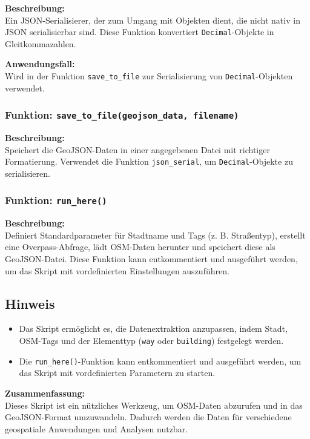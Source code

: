 \textbf{Beschreibung:}\\
Ein JSON-Serialisierer, der zum Umgang mit Objekten dient, die nicht nativ in JSON serialisierbar sind. Diese Funktion konvertiert \texttt{Decimal}-Objekte in Gleitkommazahlen.

\textbf{Anwendungsfall:}\\
Wird in der Funktion \texttt{save\_to\_file} zur Serialisierung von \texttt{Decimal}-Objekten verwendet.

\subsubsection{Funktion: \texttt{save\_to\_file(geojson\_data, filename)}}

\textbf{Beschreibung:}\\
Speichert die GeoJSON-Daten in einer angegebenen Datei mit richtiger Formatierung. Verwendet die Funktion \texttt{json\_serial}, um \texttt{Decimal}-Objekte zu serialisieren.

\subsubsection{Funktion: \texttt{run\_here()}}

\textbf{Beschreibung:}\\
Definiert Standardparameter für Stadtname und Tags (z. B. Straßentyp), erstellt eine Overpass-Abfrage, lädt OSM-Daten herunter und speichert diese als GeoJSON-Datei. Diese Funktion kann entkommentiert und ausgeführt werden, um das Skript mit vordefinierten Einstellungen auszuführen.

\subsection{Hinweis}

\begin{itemize}
    \item Das Skript ermöglicht es, die Datenextraktion anzupassen, indem Stadt, OSM-Tags und der Elementtyp (\texttt{way} oder \texttt{building}) festgelegt werden.
    \item Die \texttt{run\_here()}-Funktion kann entkommentiert und ausgeführt werden, um das Skript mit vordefinierten Parametern zu starten.
\end{itemize}

\textbf{Zusammenfassung:}\\
Dieses Skript ist ein nützliches Werkzeug, um OSM-Daten abzurufen und in das GeoJSON-Format umzuwandeln. Dadurch werden die Daten für verschiedene geospatiale Anwendungen und Analysen nutzbar.
